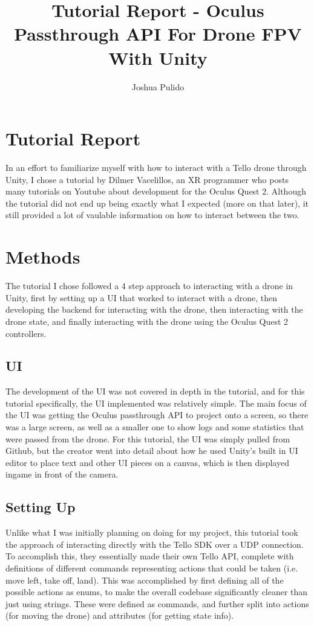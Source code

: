 \documentclass[10pt,twocolumn]{article}
\title{Tutorial Report - Oculus Passthrough API For Drone FPV With Unity}
\author{Joshua Pulido}
\affiliation{Occidental College}
\begin{document}
\maketitle

\section{Tutorial Report}
In an effort to familiarize myself with how to interact with a Tello drone through Unity, I chose a tutorial by Dilmer Vacelillos, an XR programmer who posts many tutorials on Youtube about development for the Oculus Quest 2. Although the tutorial did not end up being exactly what I expected (more on that later), it still provided a lot of vaulable information on how to interact between the two.
\section{Methods}
The tutorial I chose followed a 4 step approach to interacting with a drone in Unity, first by setting up a UI that worked to interact with a drone, then developing the backend for interacting with the drone, then interacting with the drone state, and finally interacting with the drone using the Oculus Quest 2 controllers.

\subsection{UI}

The development of the UI was not covered in depth in the tutorial, and for this tutorial specifically, the UI implemented was relatively simple. The main focus of the UI was getting the Oculus passthrough API to project onto a screen, so there was a large screen, as well as a smaller one to show logs and some statistics that were passed from the drone. For this tutorial, the UI was simply pulled from Github, but the creator went into detail about how he used Unity's built in UI editor to place text and other UI pieces on a canvas, which is then displayed ingame in front of the camera.

\subsection{Setting Up}
Unlike what I was initially planning on doing for my project, this tutorial took the approach of interacting directly with the Tello SDK over a UDP connection. To accomplish this, they essentially made their own Tello API, complete with definitions of different commands representing actions that could be taken (i.e. move left, take off, land). This was accomplished by first defining all of the possible actions as enums, to make the overall codebase significantly cleaner than just using strings. These were defined as commands, and further split into actions (for moving the drone) and attributes (for getting state info). 
\end{document}
